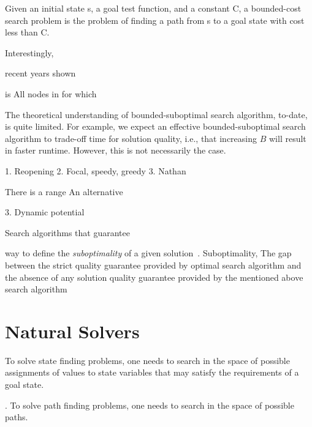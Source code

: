 Given an initial state s, a goal test function, and a constant C, a bounded-cost search problem is the problem of finding a path from s to a goal state with cost less than C.






Interestingly, 







recent years shown 


is 
All nodes in \open for which 


The theoretical understanding of bounded-suboptimal search algorithm, to-date, is quite limited. For example, we expect an effective bounded-suboptimal search algorithm to trade-off time for solution quality, i.e., that increasing $B$ will result in faster runtime. However, this is not necessarily the case. 

1. Reopening
2. Focal, speedy, greedy
3. Nathan


There is a range 
An alternative 

3. Dynamic potential






Search algorithms that guarantee

way to define the \emph{suboptimality} of a given solution~\cite{rick}. 
Suboptimality, 
The gap between the strict quality guarantee provided by optimal search algorithm and the absence of any solution quality guarantee provided by the mentioned above search algorithm


\section{Natural Solvers}
To solve state finding problems, one needs to search in the space of possible assignments of values to state variables that may satisfy the requirements of a goal state. 




. To solve path finding problems, one needs to search in the space of possible paths. 


